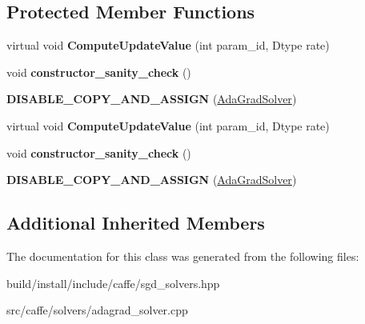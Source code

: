 \subsection*{Protected Member Functions}
\begin{DoxyCompactItemize}
\item 
\mbox{\label{classcaffe_1_1_ada_grad_solver_adbe3471f5f75aa3b8642e1eaca7ef73f}} 
virtual void {\bfseries Compute\+Update\+Value} (int param\+\_\+id, Dtype rate)
\item 
\mbox{\label{classcaffe_1_1_ada_grad_solver_a5c6e3d55dfde5836d9b37cbe7b9640e8}} 
void {\bfseries constructor\+\_\+sanity\+\_\+check} ()
\item 
\mbox{\label{classcaffe_1_1_ada_grad_solver_a1ff1971832c3ed6971c07e48dfd94b78}} 
{\bfseries D\+I\+S\+A\+B\+L\+E\+\_\+\+C\+O\+P\+Y\+\_\+\+A\+N\+D\+\_\+\+A\+S\+S\+I\+GN} (\mbox{\hyperlink{classcaffe_1_1_ada_grad_solver}{Ada\+Grad\+Solver}})
\item 
\mbox{\label{classcaffe_1_1_ada_grad_solver_a166bbd85a9b2cb18b357e0cfb7a66606}} 
virtual void {\bfseries Compute\+Update\+Value} (int param\+\_\+id, Dtype rate)
\item 
\mbox{\label{classcaffe_1_1_ada_grad_solver_a5c6e3d55dfde5836d9b37cbe7b9640e8}} 
void {\bfseries constructor\+\_\+sanity\+\_\+check} ()
\item 
\mbox{\label{classcaffe_1_1_ada_grad_solver_a1ff1971832c3ed6971c07e48dfd94b78}} 
{\bfseries D\+I\+S\+A\+B\+L\+E\+\_\+\+C\+O\+P\+Y\+\_\+\+A\+N\+D\+\_\+\+A\+S\+S\+I\+GN} (\mbox{\hyperlink{classcaffe_1_1_ada_grad_solver}{Ada\+Grad\+Solver}})
\end{DoxyCompactItemize}
\subsection*{Additional Inherited Members}


The documentation for this class was generated from the following files\+:\begin{DoxyCompactItemize}
\item 
build/install/include/caffe/sgd\+\_\+solvers.\+hpp\item 
src/caffe/solvers/adagrad\+\_\+solver.\+cpp\end{DoxyCompactItemize}
